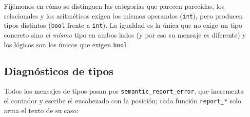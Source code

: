 \documentclass[12pt,letterpaper]{article}
\begin{document}
\bigskip

Fijémonos en cómo se distinguen las categorías que parecen parecidas, los relacionales y los aritméticos
exigen los mismos operandos (\texttt{int}), pero producen tipos distintos (\texttt{bool} frente a
\texttt{int}). La igualdad es la única que no exige un tipo concreto sino \emph{el mismo} tipo en ambos lados
(y por eso su mensaje es diferente) y los lógicos son los únicos que exigen \texttt{bool}.

\subsection*{Diagnósticos de tipos}

Todos los mensajes de tipos pasan por \texttt{semantic\_report\_error}, que incrementa el contador y escribe el
encabezado con la posición; cada función \texttt{report\_*} solo arma el texto de su caso:
\end{document}
